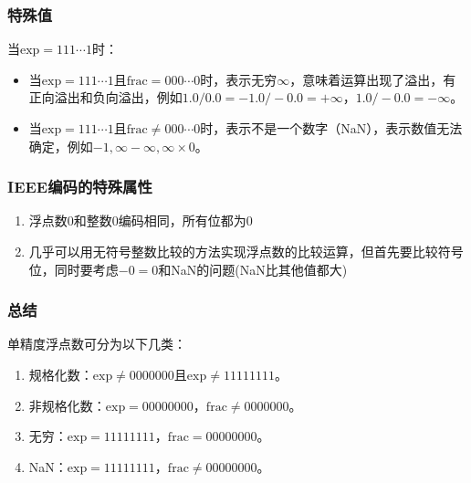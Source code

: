 \documentclass[a4paper, 12pt, UTF8]{ctexart}
\begin{document}
\subsubsection{特殊值}
当\(\text{exp}=111\cdots1\)时：
\begin{itemize}
    \item 当\(\text{exp}=111\cdots1\)且\(\text{frac}=000\cdots0\)时，表示无穷\(\infty\)，意味着运算出现了溢出，有正向溢出和负向溢出，例如\(1.0/0.0=-1.0/-0.0=+\infty\)，\(1.0/-0.0=-\infty\)。
    \item 当\(\text{exp}=111\cdots1\)且\(\text{frac}\neq000\cdots0\)时，表示不是一个数字（NaN），表示数值无法确定，例如\(-1,\infty-\infty,\infty\times0\)。
\end{itemize}

\subsubsection{IEEE编码的特殊属性}
\begin{enumerate}
    \item 浮点数0和整数0编码相同，所有位都为0
    \item 几乎可以用无符号整数比较的方法实现浮点数的比较运算，但首先要比较符号位，同时要考虑\(-0 = 0\)和NaN的问题(NaN比其他值都大)
\end{enumerate}

\subsubsection{总结}
单精度浮点数可分为以下几类：
\begin{enumerate}
    \item 规格化数：\(\text{exp}\neq0000000\)且\(\text{exp}\neq11111111\)。
    \item 非规格化数：\(\text{exp}=00000000\)，\(\text{frac}\neq0000000\)。
    \item 无穷：\(\text{exp}=11111111\)，\(\text{frac}=00000000\)。
    \item NaN：\(\text{exp}=11111111\)，\(\text{frac}\neq00000000\)。
\end{enumerate}
\end{document}
